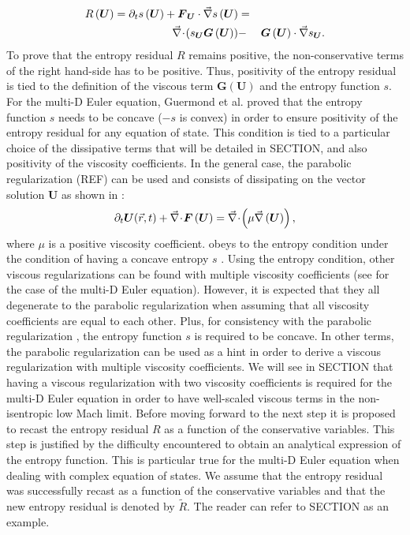 \begin{enumerate}
\begin{eqnarray}
R\left(\boldsymbol{U}\right) = \partial_t s\left(\boldsymbol{U}\right) + \boldsymbol{F}_{\boldsymbol{U}} \cdot \vec{\nabla} s \left(\boldsymbol{U}\right) &=& \nonumber \\
\vec{\nabla}\! \cdot \! ( s_{\boldsymbol{U}} \boldsymbol{G}  \left( \boldsymbol{U} \right) ) &-& \boldsymbol{G}  \left( \boldsymbol{U} \right) \cdot \vec{\nabla} s_{\boldsymbol{U}}.
\end{eqnarray}
%
To prove that the entropy residual $R$ remains positive, the non-conservative terms of the right hand-side has to be positive. Thus, positivity of the entropy residual is tied to the definition of the viscous term $\boldsymbol{G}  \left( \boldsymbol{U} \right)$ and the entropy function $s$. For the multi-D Euler equation, Guermond et al. \cite{jlg} proved that the entropy function $s$ needs to be concave ($-s$ is convex) in order to ensure positivity of the entropy residual for any equation of state. This condition is tied to a particular choice of the dissipative terms that will be detailed in SECTION, and also positivity of the viscosity coefficients. In the general case, the parabolic regularization (REF) can be used and consists of dissipating on the vector solution $\boldsymbol{U}$ as shown in : 
%
\begin{equation}\label{eq:hyp_syst4_sct1b}
\partial_t \boldsymbol{U}(\vec{r},t) + \vec{\nabla}\! \cdot \! \boldsymbol{F} \left( \boldsymbol{U} \right) = \vec{\nabla}\! \cdot \! \left( \mu \vec{\nabla} \left( \boldsymbol{U} \right) \right),
\end{equation}
%
where $\mu$ is a positive viscosity coefficient.  obeys to the entropy condition under the condition of having a concave entropy $s$ \cite{Parabolic}. Using the entropy condition, other viscous regularizations can be found with multiple viscosity coefficients (see \cite{jlg} for the case of the multi-D Euler equation). However, it is expected that they all degenerate to the parabolic regularization when assuming that all viscosity coefficients are equal to each other. Plus, for consistency with the parabolic regularization \cite{Parabolic}, the entropy function $s$ is required to be concave. In other terms, the parabolic regularization can be used as a hint in order to derive a viscous regularization with multiple viscosity coefficients. We will see in SECTION that having a viscous regularization with two viscosity coefficients is required for the multi-D Euler equation in order to have well-scaled viscous terms in the non-isentropic low Mach limit. Before moving forward to the next step it is proposed to recast the entropy residual $R$ as a function of the conservative variables. This step is justified by the difficulty encountered to obtain an analytical expression of the entropy function. This is particular true for the multi-D Euler equation when dealing with complex equation of states. We assume that the entropy residual was successfully recast as a function of the conservative variables and that the new entropy residual is denoted by $\tilde{R}$. The reader can refer to SECTION as an example.

\end{enumerate}
